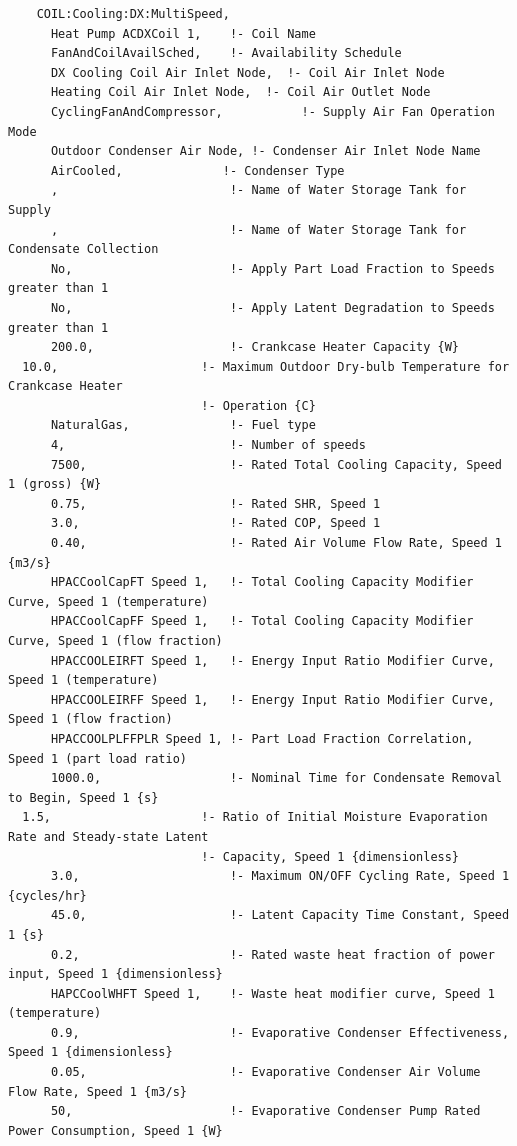 \begin{lstlisting}
    COIL:Cooling:DX:MultiSpeed,
      Heat Pump ACDXCoil 1,    !- Coil Name
      FanAndCoilAvailSched,    !- Availability Schedule
      DX Cooling Coil Air Inlet Node,  !- Coil Air Inlet Node
      Heating Coil Air Inlet Node,  !- Coil Air Outlet Node
      CyclingFanAndCompressor,           !- Supply Air Fan Operation Mode
      Outdoor Condenser Air Node, !- Condenser Air Inlet Node Name
      AirCooled,              !- Condenser Type
      ,                        !- Name of Water Storage Tank for Supply
      ,                        !- Name of Water Storage Tank for Condensate Collection
      No,                      !- Apply Part Load Fraction to Speeds greater than 1
      No,                      !- Apply Latent Degradation to Speeds greater than 1
      200.0,                   !- Crankcase Heater Capacity {W}
  10.0,                    !- Maximum Outdoor Dry-bulb Temperature for Crankcase Heater
                           !- Operation {C}
      NaturalGas,              !- Fuel type
      4,                       !- Number of speeds
      7500,                    !- Rated Total Cooling Capacity, Speed 1 (gross) {W}
      0.75,                    !- Rated SHR, Speed 1
      3.0,                     !- Rated COP, Speed 1
      0.40,                    !- Rated Air Volume Flow Rate, Speed 1 {m3/s}
      HPACCoolCapFT Speed 1,   !- Total Cooling Capacity Modifier Curve, Speed 1 (temperature)
      HPACCoolCapFF Speed 1,   !- Total Cooling Capacity Modifier Curve, Speed 1 (flow fraction)
      HPACCOOLEIRFT Speed 1,   !- Energy Input Ratio Modifier Curve, Speed 1 (temperature)
      HPACCOOLEIRFF Speed 1,   !- Energy Input Ratio Modifier Curve, Speed 1 (flow fraction)
      HPACCOOLPLFFPLR Speed 1, !- Part Load Fraction Correlation, Speed 1 (part load ratio)
      1000.0,                  !- Nominal Time for Condensate Removal to Begin, Speed 1 {s}
  1.5,                     !- Ratio of Initial Moisture Evaporation Rate and Steady-state Latent
                           !- Capacity, Speed 1 {dimensionless}
      3.0,                     !- Maximum ON/OFF Cycling Rate, Speed 1 {cycles/hr}
      45.0,                    !- Latent Capacity Time Constant, Speed 1 {s}
      0.2,                     !- Rated waste heat fraction of power input, Speed 1 {dimensionless}
      HAPCCoolWHFT Speed 1,    !- Waste heat modifier curve, Speed 1 (temperature)
      0.9,                     !- Evaporative Condenser Effectiveness, Speed 1 {dimensionless}
      0.05,                    !- Evaporative Condenser Air Volume Flow Rate, Speed 1 {m3/s}
      50,                      !- Evaporative Condenser Pump Rated Power Consumption, Speed 1 {W}

\end{lstlisting}
